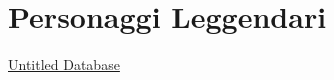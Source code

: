 \section{Personaggi Leggendari}\label{personaggi-leggendari}

\href{Untitled\%20Database\%2015aa07aed3c74b7493ef695da0c7f995.csv}{Untitled
Database}
